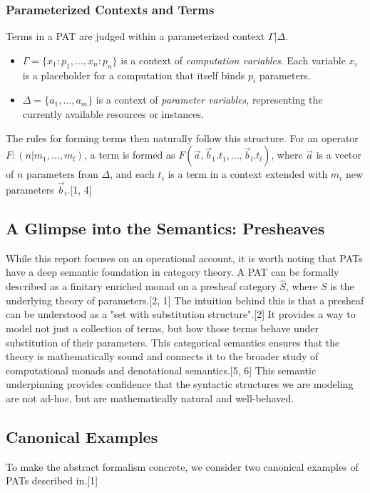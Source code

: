 \documentclass{article}
\begin{document}
\subsubsection{Parameterized Contexts and Terms}
Terms in a PAT are judged within a parameterized context $\Gamma|\Delta$.
\begin{itemize}
    \item $\Gamma = \{x_1:p_1, \dots, x_n:p_n\}$ is a context of \emph{computation variables}. Each variable $x_i$ is a placeholder for a computation that itself binds $p_i$ parameters.
    \item $\Delta = \{a_1, \dots, a_m\}$ is a context of \emph{parameter variables}, representing the currently available resources or instances.
\end{itemize}
The rules for forming terms then naturally follow this structure. For an operator $F:(n|m_{1},...,m_{l})$, a term is formed as $F(\vec{a}, \vec{b}_1.t_1, \dots, \vec{b}_l.t_l)$, where $\vec{a}$ is a vector of $n$ parameters from $\Delta$, and each $t_i$ is a term in a context extended with $m_i$ new parameters $\vec{b}_i$.[1, 4]

\subsection{A Glimpse into the Semantics: Presheaves}
While this report focuses on an operational account, it is worth noting that PATs have a deep semantic foundation in category theory. A PAT can be formally described as a finitary enriched monad on a presheaf category $\hat{S}$, where $S$ is the underlying theory of parameters.[2, 1] The intuition behind this is that a presheaf can be understood as a "set with substitution structure".[2] It provides a way to model not just a collection of terms, but how those terms behave under substitution of their parameters. This categorical semantics ensures that the theory is mathematically sound and connects it to the broader study of computational monads and denotational semantics.[5, 6] This semantic underpinning provides confidence that the syntactic structures we are modeling are not ad-hoc, but are mathematically natural and well-behaved.

\subsection{Canonical Examples}
To make the abstract formalism concrete, we consider two canonical examples of PATs described in.[1]
\end{document}
